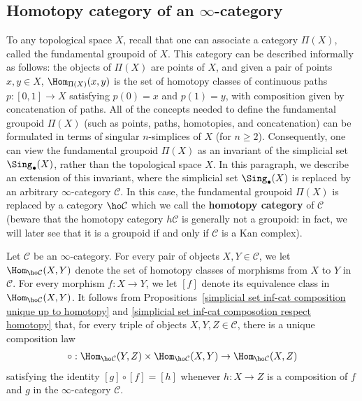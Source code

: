 \subsection{Homotopy category of an \texorpdfstring{$\infty$}{inf}-category}
To any topological space $X$, recall that one can associate a category $\Pi(X)$, called the fundamental groupoid of $X$. This category can be described informally as follows: the objects of $\Pi(X)$ are points of $X$, and given a pair of points $x,y\in X$, $\Hom_{\Pi(X)}(x,y)$ is the set of homotopy classes of continuous paths $p:[0,1]\to X$ satisfying $p(0)=x$ and $p(1)=y$, with composition given by concatenation of paths. All of the concepts needed to define the fundamental groupoid $\Pi(X)$ (such as points, paths, homotopies, and concatenation) can be formulated in terms of singular $n$-simplices of $X$ (for $n\geq 2$). Consequently, one can view the fundamental groupoid $\Pi(X)$ as an invariant of the simplicial set $\Sing_\bullet(X)$, rather than the topological space $X$. In this paragraph, we describe an extension of this invariant, where the simplicial set $\Sing_\bullet(X)$ is replaced by an arbitrary $\infty$-category $\mathcal{C}$. In this case, the fundamental groupoid $\Pi(X)$ is replaced by a category $\ho\mathcal{C}$ which we call the \textbf{homotopy category} of $\mathcal{C}$ (beware that the homotopy category $h\mathcal{C}$ is generally not a groupoid: in fact, we will later see that it is a groupoid if and only if $\mathcal{C}$ is a Kan complex).\par
Let $\mathcal{C}$ be an $\infty$-category. For every pair of objects $X,Y\in\mathcal{C}$, we let $\Hom_{\ho\mathcal{C}}(X,Y)$ denote the set of homotopy classes of morphisms from $X$ to $Y$ in $\mathcal{C}$. For every morphism $f:X\to Y$, we let $[f]$ denote its equivalence class in $\Hom_{\ho\mathcal{C}}(X,Y)$. It follows from Propositions~\ref{simplicial set inf-cat composition unique up to homotopy} and \ref{simplicial set inf-cat composotion respect homotopy} that, for every triple of objects $X,Y,Z\in\mathcal{C}$, there is a unique composition law
\begin{align}\label{simplicial set inf-cat composition in homotopy cat}
\circ:\Hom_{\ho\mathcal{C}}(Y,Z)\times\Hom_{\ho\mathcal{C}}(X,Y)\to\Hom_{\ho\mathcal{C}}(X,Z)
\end{align}
satisfying the identity $[g]\circ[f]=[h]$ whenever $h:X\to Z$ is a composition of $f$ and $g$ in the $\infty$-category $\mathcal{C}$.
